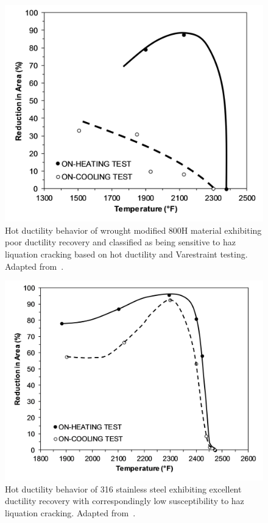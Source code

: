 {\begin{figure}
    \centering
    \includegraphics{figures/qiao-hot-ductility-800h-susceptible-r1.png}
    \caption[Hot ductility behavior of wrought modified 800H material exhibiting poor ductility recovery.]{Hot ductility behavior of wrought modified 800H material exhibiting poor ductility recovery and classified as being sensitive to \gls{haz} liquation cracking based on hot ductility and Varestraint testing. Adapted from~\citet{qiao_weldability_1993}.}
    \label{fig:qiao-hot-ductility-800h-susceptible}
\end{figure}

\begin{figure}
    \centering
    \includegraphics{figures/qiao-hot-ductility-ref-316-r1.png}
    \caption[Hot ductility behavior of 316 stainless steel exhibiting excellent ductility recovery.]{Hot ductility behavior of 316 stainless steel exhibiting excellent ductility recovery with correspondingly low susceptibility to \gls{haz} liquation cracking. Adapted from~\citet{qiao_weldability_1993}.}
    \label{fig:qiao-hot-ductility-316}
\end{figure}

}
